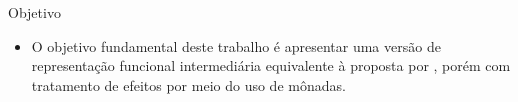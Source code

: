 \begin{frame}{Objetivo}
    \begin{itemize}
        \item O objetivo fundamental deste trabalho é apresentar uma versão de representação funcional intermediária equivalente à proposta por , porém com tratamento de efeitos por meio do uso de mônadas.
    \end{itemize}
\end{frame}